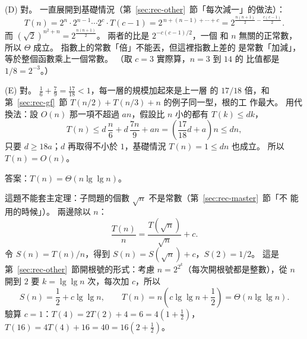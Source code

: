 (D) 對。 一直展開到基礎情況（第~\ref{sec:rec-other}~節「每次減一」的做法）：
\[
T(n) = 2^n \cdot 2^{n-1} \cdots 2^{c} \cdot T(c - 1) = 2^{\,n + (n-1) + \cdots + c}
= 2^{\frac{n(n+1)}{2} - \frac{c(c-1)}{2}} .
\]
而 $(\sqrt{2})^{n^2 + n} = 2^{\frac{n(n+1)}{2}}$。 兩者的比是 $2^{-c(c-1)/2}$，一個
和 $n$ 無關的正常數，所以 $\Theta$ 成立。 指數上的常數「倍」不能丟，但這裡指數上差的
是常數「加減」，等於整個函數乘上一個常數。 （取 $c = 3$ 實際算，$n = 3$ 到 $14$ 的
比值都是 $1/8 = 2^{-3}$。）

(E) 對。 $\frac{1}{6} + \frac{7}{9} = \frac{17}{18} < 1$，每一層的規模加起來是上一層
的 $17/18$ 倍，和第~\ref{sec:rec-gf}~節 $T(n/2) + T(n/3) + n$ 的例子同一型，根的工
作最大。 用代換法：設 $O(n)$ 那一項不超過 $an$，假設比 $n$ 小的都有 $T(k) \le dk$，
\[
T(n) \le d\,\frac{n}{6} + d\,\frac{7n}{9} + an = \left(\frac{17}{18}d + a\right) n
\le dn ,
\]
只要 $d \ge 18a$；$d$ 再取得不小於 $1$，基礎情況 $T(n) = 1 \le dn$ 也成立。 所以
$T(n) = O(n)$。

答案：$T(n) = \Theta(n \lg \lg n)$。

這題不能套主定理：子問題的個數 $\sqrt{n}$ 不是常數（第~\ref{sec:rec-master}~節「不
能用的時候」）。 兩邊除以 $n$：
\[
\frac{T(n)}{n} = \frac{T(\sqrt{n})}{\sqrt{n}} + c .
\]
令 $S(n) = T(n)/n$，得到 $S(n) = S(\sqrt{n}) + c$，$S(2) = 1/2$。 這是
第~\ref{sec:rec-other}~節開根號的形式：考慮 $n = 2^{2^k}$（每次開根號都是整數），從
$n$ 開到 $2$ 要 $k = \lg \lg n$ 次，每次加 $c$，所以
\[
S(n) = \frac{1}{2} + c \lg \lg n, \qquad T(n) = n \left(c \lg \lg n + \frac{1}{2}\right)
= \Theta(n \lg \lg n).
\]
驗算 $c = 1$：$T(4) = 2T(2) + 4 = 6 = 4(1 + \frac{1}{2})$，
$T(16) = 4T(4) + 16 = 40 = 16(2 + \frac{1}{2})$。
